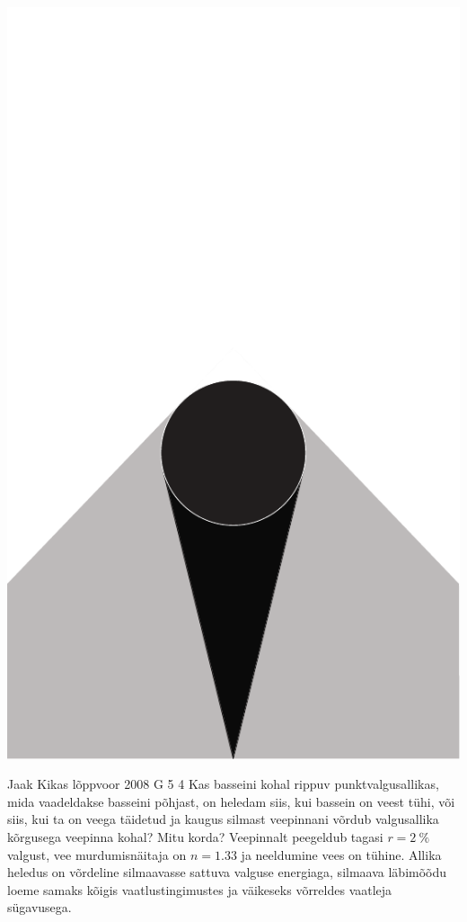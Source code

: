 \documentclass[11pt, twoside]{article}
\begin{document}
{{\begin{center}
	\includegraphics[height=0.8\textheight]{2007-v2g-06-yl}
\end{center}
\fi
}

{Jaak Kikas} %
{lõppvoor} %
{2008} %
{G 5} %
{4} %
{
\ifStatement
Kas basseini kohal rippuv punktvalgusallikas, mida vaadeldakse basseini põhjast, on heledam siis, kui bassein on veest tühi, või siis, kui ta on veega täidetud ja kaugus silmast veepinnani võrdub valgusallika kõrgusega veepinna kohal? Mitu korda? Veepinnalt peegeldub tagasi $r = \SI{2}{\%}$ valgust, vee murdumisnäitaja on $n = \num{1,33}$ ja neeldumine vees on tühine. Allika heledus on võrdeline silmaavasse sattuva valguse energiaga, silmaava läbimõõdu loeme samaks kõigis vaatlustingimustes ja väikeseks võrreldes vaatleja sügavusega.
\fi
}

}
\end{document}
